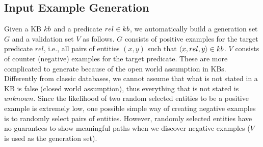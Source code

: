 \subsection{Input Example Generation} \label{sec:ex_generation}
\vspace{-1ex}
Given a KB ${\sc kb}$ and a predicate $rel \in {\sc kb}$, we automatically build a generation set $G$ and a validation set $V$ as follows. 
$G$ consists of positive examples for the target predicate $rel$, i.e., all pairs of entities $(x,y)$ such that $\langle x,rel,y\rangle \in {\sc kb}$.
$V$ consists of counter (negative) examples for the target predicate.
These are more complicated to generate because of the open world assumption in KBs. 
Differently from classic databases, we cannot assume that what is not stated in a KB is false (closed world assumption), thus everything that is not stated is $unknown$. %
Since the likelihood of two random selected entities to be a positive example is extremely low, one possible simple way of creating negative examples is to randomly select pairs of entities. However, randomly selected entities have no guarantees to show meaningful paths when we discover negative examples ($V$ is used as the generation set).

